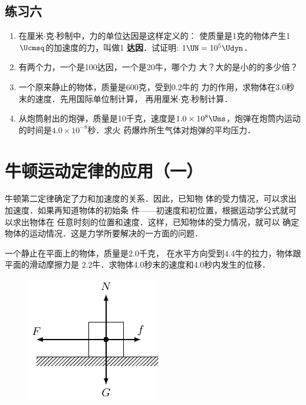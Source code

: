 \subsection*{练习六}
\begin{enumerate}
\item 在厘米$\cdot$克$\cdot$秒制中，力的单位达因是这样定义的：
使质量是1克的物体产生1$\Ucmsq$的加速度的力，叫做1
\textbf{达因}．试证明: $1\UN=10^5\Udyn$．
\item 有两个力，一个是100达因，一个是20牛，哪个力
大？大的是小的的多少倍？
\item 一个原来静止的物体，质量是600克，受到0.2牛的
力的作用，求物体在3.0秒末的速度．先用国际单位制计算，
再用厘米$\cdot$克$\cdot$秒制计算．
\item 从炮筒射出的炮弹，质量是10千克，速度是$1.0\times 
10^8\Ums$，炮弹在炮筒内运动的时间是$4.0\times 10^{-8}$秒．求火
药爆炸所生气体对炮弹的平均压力．

\end{enumerate}

\section{牛顿运动定律的应用（一）}
    牛顿第二定律确定了力和加速度的关系．因此，已知物
体的受力情况，可以求出加速度．如果再知道物体的初始条
件——初速度和初位置，根据运动学公式就可以求出物体在
任意时刻的位置和速度．这样，已知物体的受力情况，就可以
确定物体的运动情况．这是力学所要解决的一方面的问题．

\begin{example}
一个静止在平面上的物体，质量是2.0千克，
在水平方向受到4.4牛的拉力，物体跟平面的滑动摩擦力是
2.2牛．求物体4.0秒末的速度和4.0秒内发生的位移．
\end{example}

\begin{figure}[htp]
    \centering
    \includegraphics{fig/A/3-8.pdf}
    \caption{}\label{fig_A_3-8}
\end{figure}

